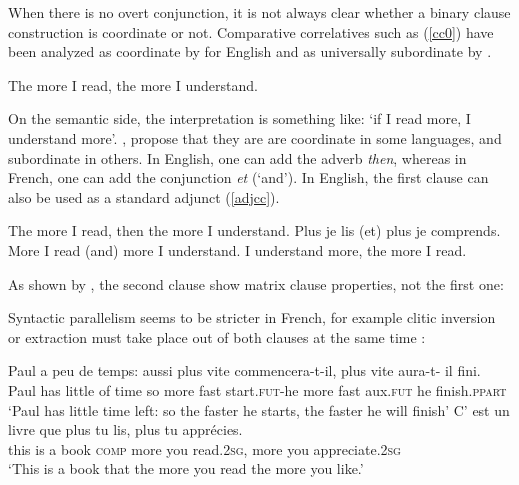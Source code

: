 \documentclass[output=paper]{langsci/langscibook}
\begin{document}
When there is no overt conjunction, it is not always clear whether a binary clause construction is coordinate or not. Comparative correlatives such as (\ref{cc0}) have been analyzed as coordinate by \citet{culijack} for English and as universally subordinate  by \citet{dikken}. 

\begin{exe}
\ex The more I read, the more I understand. \label{cc0}
\end{exe}

On the semantic side, the interpretation is something like: `if I read more, I understand more'. \citet{Abeille:06}, \citet{Abeille:Borsley:08} propose that they are are coordinate in some languages, 
 and subordinate in others. In English, one can add the adverb \emph{then}, whereas in French, one can add the conjunction \emph{et} (`and'). In English, the first clause can also be used as a standard adjunct (\ref{adjcc}).
 
 
 
 \begin{exe}
 \ex
\begin{xlista}
\ex The more I read, then the more I understand.
\ex Plus je lis (et) plus je comprends.\\
More I read (and) more I understand.
\ex I understand more, the more I read.
\end{xlista}\label{adjcc}
\end{exe}

As shown by \citet[549-550]{culijack}, the second clause show matrix clause properties, not the first one:

\begin{exe}
 \ex
\begin{xlista}
\end{xlista}
\end{exe}

Syntactic parallelism seems to be stricter in French, for example clitic inversion or extraction must take place out of both clauses at the same time \citep{Abeille:Borsley:08}:

\begin{exe}
 \ex
\begin{xlista}
\ex \gll Paul a     peu  de temps: aussi plus  vite commencera-t-il,  plus   vite  aura-t-      il  fini.\\
Paul has little of time so more fast start.\textsc{fut}-he more fast  aux.\textsc{fut} he finish.\textsc{ppart} \\
\glt `Paul has little time left: so the faster he starts, the faster he will finish'
\ex \gll C'   est un livre  que      plus   tu    lis, plus  tu    appr\'{e}cies. \\
this is    a  book \textsc{comp} more you read.2\textsc{sg},  more you appreciate.2\textsc{sg} \\
\glt `This is a book that the more you read the more you like.'
\end{xlista}
\end{exe}
\end{document}
